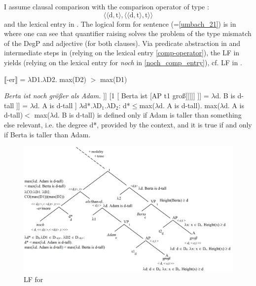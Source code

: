 \documentclass[output=paper]{langsci/langscibook}
\begin{document}
I assume clausal comparison with the comparison operator of type \citep[cf.][]{Beck2011}: 
    \[\langle\langle \text{d},\text{t}\rangle,\langle\langle \text{d},\text{t}\rangle,\text{t}\rangle\rangle \] 
and the lexical entry in . The logical form for sentence  (=\ref{umbach_21}) is in  where one can see that quantifier raising solves the problem of the type mismatch of the DegP and adjective (for both clauses). Via predicate abstraction in  and intermediate steps in  (relying on the lexical entry \ref{comp-operator}), the LF in  yields  (relying on the lexical entry for \textit{noch} in \ref{noch_comp_entry}), cf. LF in .

\ea\relax $⟦$-er$⟧$ = $\lambda$D1.$\lambda$D2. max(D2) $>$ max(D1) \label{comp-operator}

\ex\ea \textit{Berta ist noch größer als Adam.} \label{B_noch_>_Adam}
\ex\relax [ noch d* [-er than [2[Adam ist [AP t2 groß]]] [1 [ Berta ist [AP t1 groß]]]]] \label{LF_B_noch_>_Adam}
\z
\ex\ea \label{PA_on_clauses}\relax [1 [ Berta ist [AP t1 groß]]] = $\lambda$d. B is d-tall
\ex\relax [2 [Adam ist [AP t2 groß]]] =  $\lambda$d. A is d-tall \z
\ex\relax [ noch d* [$\lambda$D1.$\lambda$D2. max($\lambda$d. B is d-tall) $>$ max($\lambda$d$'$. A is d$'$-tall) ]] \label{calc_plugin}
\ex $\lambda$d*.$\lambda$D$_1$.$\lambda$D$_2$: d*$\leq$max($\lambda$d. A is d-tall). max($\lambda$d. A is d-tall)$<$ max($\lambda$d. B is d-tall)  \label{output_calc}
\ex {} is defined only if Adam is taller than something else relevant, i.e. the degree d*, provided by the context, and it is true if and only if Berta is taller than Adam.\z

\begin{figure}
\includegraphics[width=1\textwidth]{figures/LF-mod_comp}
\caption{LF for }
\label{fig:LF_B_noch_>_Adam}
\end{figure}
\end{document}
